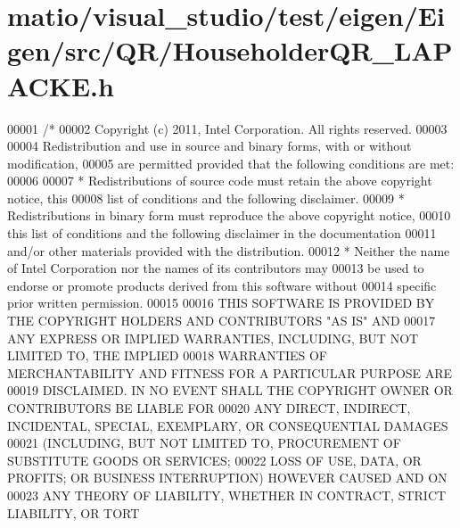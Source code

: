 \hypertarget{matio_2visual__studio_2test_2eigen_2_eigen_2src_2_q_r_2_householder_q_r___l_a_p_a_c_k_e_8h_source}{}\section{matio/visual\+\_\+studio/test/eigen/\+Eigen/src/\+Q\+R/\+Householder\+Q\+R\+\_\+\+L\+A\+P\+A\+C\+KE.h}
\label{matio_2visual__studio_2test_2eigen_2_eigen_2src_2_q_r_2_householder_q_r___l_a_p_a_c_k_e_8h_source}

\begin{DoxyCode}
00001 \textcolor{comment}{/*}
00002 \textcolor{comment}{ Copyright (c) 2011, Intel Corporation. All rights reserved.}
00003 \textcolor{comment}{}
00004 \textcolor{comment}{ Redistribution and use in source and binary forms, with or without modification,}
00005 \textcolor{comment}{ are permitted provided that the following conditions are met:}
00006 \textcolor{comment}{}
00007 \textcolor{comment}{ * Redistributions of source code must retain the above copyright notice, this}
00008 \textcolor{comment}{   list of conditions and the following disclaimer.}
00009 \textcolor{comment}{ * Redistributions in binary form must reproduce the above copyright notice,}
00010 \textcolor{comment}{   this list of conditions and the following disclaimer in the documentation}
00011 \textcolor{comment}{   and/or other materials provided with the distribution.}
00012 \textcolor{comment}{ * Neither the name of Intel Corporation nor the names of its contributors may}
00013 \textcolor{comment}{   be used to endorse or promote products derived from this software without}
00014 \textcolor{comment}{   specific prior written permission.}
00015 \textcolor{comment}{}
00016 \textcolor{comment}{ THIS SOFTWARE IS PROVIDED BY THE COPYRIGHT HOLDERS AND CONTRIBUTORS "AS IS" AND}
00017 \textcolor{comment}{ ANY EXPRESS OR IMPLIED WARRANTIES, INCLUDING, BUT NOT LIMITED TO, THE IMPLIED}
00018 \textcolor{comment}{ WARRANTIES OF MERCHANTABILITY AND FITNESS FOR A PARTICULAR PURPOSE ARE}
00019 \textcolor{comment}{ DISCLAIMED. IN NO EVENT SHALL THE COPYRIGHT OWNER OR CONTRIBUTORS BE LIABLE FOR}
00020 \textcolor{comment}{ ANY DIRECT, INDIRECT, INCIDENTAL, SPECIAL, EXEMPLARY, OR CONSEQUENTIAL DAMAGES}
00021 \textcolor{comment}{ (INCLUDING, BUT NOT LIMITED TO, PROCUREMENT OF SUBSTITUTE GOODS OR SERVICES;}
00022 \textcolor{comment}{ LOSS OF USE, DATA, OR PROFITS; OR BUSINESS INTERRUPTION) HOWEVER CAUSED AND ON}
00023 \textcolor{comment}{ ANY THEORY OF LIABILITY, WHETHER IN CONTRACT, STRICT LIABILITY, OR TORT}

\end{DoxyCode}

